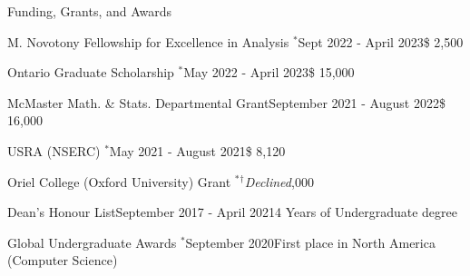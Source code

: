 \begin{rSection}{Funding, Grants, and Awards} 

\begin{aSubsection}{M. Novotony Fellowship for Excellence in Analysis $^{\ast}$}{Sept 2022 - April 2023}{\$ 2,500}{}
\end{aSubsection}

\begin{aSubsection}{Ontario Graduate Scholarship $^{\ast}$}{May 2022 - April 2023}{\$ 15,000}{}
\end{aSubsection}

\begin{aSubsection}{McMaster Math. \& Stats. Departmental Grant}{September 2021 - August 2022}{\$ 16,000}{}
\end{aSubsection}

\begin{aSubsection}{USRA (NSERC) $^{\ast}$}{May 2021 - August 2021}{\$ 8,120}{}
\end{aSubsection}

\begin{aSubsection}{Oriel College (Oxford University) Grant $^{\ast}$}{$^\dagger$\emph{Declined}}{,000}{}
\end{aSubsection}

\begin{aSubsection}{Dean's Honour List}{September 2017 - April 2021}{4 Years of Undergraduate degree}
{}
\end{aSubsection}

\begin{aSubsection}{Global Undergraduate Awards $^{\ast}$}{September 2020}{First place in North America (Computer Science)}
{}


\end{aSubsection}
\end{rSection}
